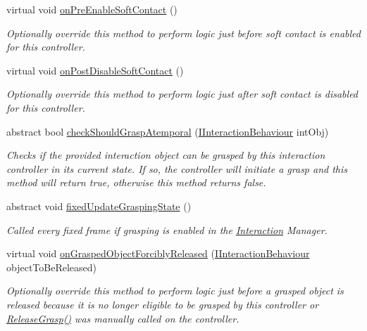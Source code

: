 \begin{DoxyCompactItemize}
virtual void \mbox{\hyperlink{class_leap_1_1_unity_1_1_interaction_1_1_interaction_controller_ae5952ec4f81442c19ecb558bbcfebaa2}{on\+Pre\+Enable\+Soft\+Contact}} ()
\begin{DoxyCompactList}\small\item\em Optionally override this method to perform logic just before soft contact is enabled for this controller. \end{DoxyCompactList}\item 
virtual void \mbox{\hyperlink{class_leap_1_1_unity_1_1_interaction_1_1_interaction_controller_ad9c7c365e25236d6c2441d60d9ce6130}{on\+Post\+Disable\+Soft\+Contact}} ()
\begin{DoxyCompactList}\small\item\em Optionally override this method to perform logic just after soft contact is disabled for this controller. \end{DoxyCompactList}\item 
abstract bool \mbox{\hyperlink{class_leap_1_1_unity_1_1_interaction_1_1_interaction_controller_a99f071b469073deb8265da627e90ad0c}{check\+Should\+Grasp\+Atemporal}} (\mbox{\hyperlink{interface_leap_1_1_unity_1_1_interaction_1_1_i_interaction_behaviour}{I\+Interaction\+Behaviour}} int\+Obj)
\begin{DoxyCompactList}\small\item\em Checks if the provided interaction object can be grasped by this interaction controller in its current state. If so, the controller will initiate a grasp and this method will return true, otherwise this method returns false. \end{DoxyCompactList}\item 
abstract void \mbox{\hyperlink{class_leap_1_1_unity_1_1_interaction_1_1_interaction_controller_a5d182056bac8aea2d0ec005e35f768ca}{fixed\+Update\+Grasping\+State}} ()
\begin{DoxyCompactList}\small\item\em Called every fixed frame if grasping is enabled in the \mbox{\hyperlink{namespace_leap_1_1_unity_1_1_interaction}{Interaction}} Manager. \end{DoxyCompactList}\item 
virtual void \mbox{\hyperlink{class_leap_1_1_unity_1_1_interaction_1_1_interaction_controller_a9850539b1321c83e5a71c5e47eef6df1}{on\+Grasped\+Object\+Forcibly\+Released}} (\mbox{\hyperlink{interface_leap_1_1_unity_1_1_interaction_1_1_i_interaction_behaviour}{I\+Interaction\+Behaviour}} object\+To\+Be\+Released)
\begin{DoxyCompactList}\small\item\em Optionally override this method to perform logic just before a grasped object is released because it is no longer eligible to be grasped by this controller or \mbox{\hyperlink{class_leap_1_1_unity_1_1_interaction_1_1_interaction_controller_a3468a89e21c685d6df962ce70684c92f}{Release\+Grasp()}} was manually called on the controller. \end{DoxyCompactList}\item 

\end{DoxyCompactItemize}
